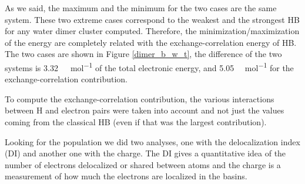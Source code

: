 As we said, the maximum and the minimum for the two cases are the same system.
These two extreme cases correspond to the weakest and the strongest HB for any
water dimer cluster computed. Therefore, the minimization/maximization of the
energy are completely related with the exchange-correlation energy of HB.  The
two cases are shown in Figure \ref{dimer_b_w_t}, the difference of the two
systems is \SI{3.32}{\kilo\calorie\per\mole} of the total electronic energy,
and 5.05 \si{\kilo\calorie\per\mole} for the exchange-correlation contribution.

\newpage

To compute the exchange-correlation contribution, the various interactions between H and
electron pairs were taken into account and not just the values coming from the
classical HB (even if that was the largest contribution).

Looking for the population we did two analyses, one with the delocalization
index (DI) and another one with the charge. The DI gives a
quantitative idea of the number of electrons delocalized or shared between
atoms and the charge is a measurement of how much the electrons are localized in the
basins.

\newpage

